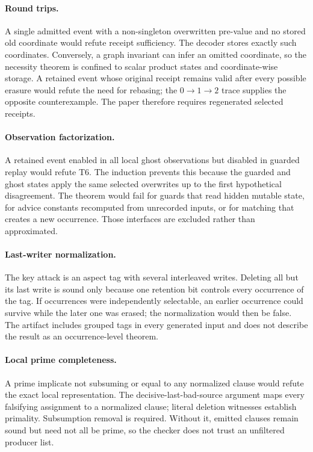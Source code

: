\paragraph{Round trips.}
A single admitted event with a non-singleton overwritten pre-value and no stored old
coordinate would refute receipt sufficiency.  The decoder stores exactly such
coordinates.  Conversely, a graph invariant can infer an omitted coordinate, so the
necessity theorem is confined to scalar product states and coordinate-wise storage.
A retained event whose original receipt remains valid after every possible erasure
would refute the need for rebasing; the $0\to1\to2$ trace supplies the opposite
counterexample.  The paper therefore requires regenerated selected receipts.

\paragraph{Observation factorization.}
A retained event enabled in all local ghost observations but disabled in guarded
replay would refute T6.  The induction prevents this because the guarded and ghost
states apply the same selected overwrites up to the first hypothetical disagreement.
The theorem would fail for guards that read hidden mutable state, for advice constants
recomputed from unrecorded inputs, or for matching that creates a new occurrence.
Those interfaces are excluded rather than approximated.

\paragraph{Last-writer normalization.}
The key attack is an aspect tag with several interleaved writes.  Deleting all but its
last write is sound only because one retention bit controls every occurrence of the
tag.  If occurrences were independently selectable, an earlier occurrence could
survive while the later one was erased; the normalization would then be false.  The
artifact includes grouped tags in every generated input and does not describe the
result as an occurrence-level theorem.

\paragraph{Local prime completeness.}
A prime implicate not subsuming or equal to any normalized clause would refute the
exact local representation.  The decisive-last-bad-source argument maps every
falsifying assignment to a normalized clause; literal deletion witnesses establish
primality.  Subsumption removal is required.  Without it, emitted clauses remain
sound but need not all be prime, so the checker does not trust an unfiltered producer
list.

